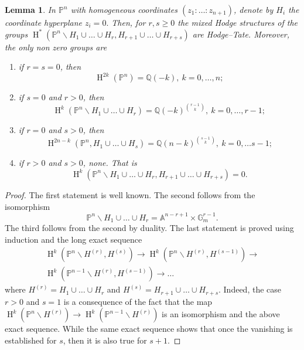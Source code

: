 \documentclass[11pt,a4paper]{amsart}
\newcommand{\A}{\mathds{A}}
\newcommand{\G}{\mathds{G}}
\renewcommand{\P}{\mathds{P}}
\newcommand{\Q}{\mathds{Q}}
\DeclareMathOperator{\rH}{H}
\numberwithin{equation}{section}
\theoremstyle{plain}
\newtheorem{lem}[prop]{Lemma}
\theoremstyle{definition}
\begin{document}
\begin{lem}\label{lemm:4} In $\P^{n}$ with homogeneous coordinates $(z_{1}\colon
  \dots\colon z_{n+1})$, denote by $H_{i}$ the coordinate hyperplane
  $z_{i}=0.$ Then, for $r,s \ge 0$ the mixed Hodge structures of the
  groups $\rH^{\ast}(\P^{n}\smallsetminus H_{1}\cup\dots \cup
  H_{r}, H_{r+1}\cup \dots \cup H_{r+s})$ are Hodge--Tate. Moreover, the
  only non zero groups are 
  \begin{enumerate}
  \item if $r=s=0$, then
    \begin{displaymath}
      \rH^{2k}(\P^{n})= \Q(-k),\ k=0,\dots,n;  
    \end{displaymath}
  \item if $s=0$ and $r>0$, then
    \begin{displaymath}
      \rH^{k}(\P^{n}\smallsetminus H_{1}\cup\dots\cup H_{r})=
      \Q(-k)^{\binom{r-1}{k}},\ k=0,\dots,r-1;
    \end{displaymath}
  \item if $r=0$ and $s>0$, then
    \begin{displaymath}
      \rH^{2n-k}(\P^{n},H_{1}\cup\dots\cup H_{s})=
      \Q(n-k)^{\binom{s-1}{k}},\ k=0,\dots s-1; 
    \end{displaymath}
  \item if $r>0$ and $s>0$, none. That is
    \begin{displaymath}
      \rH^{k}(\P^{n}\smallsetminus H_{1}\cup\dots \cup
  H_{r},H_{r+1}\cup \dots \cup H_{r+s})=0.
    \end{displaymath}
  \end{enumerate}
\end{lem}
\begin{proof}
  The first statement is well known. The second follows from the
  isomorphism
  \begin{displaymath}
    \P^{n}\smallsetminus H_{1}\cup\dots\cup H_{r}=\A^{n-r+1}\times \G_{m}^{r-1}.
  \end{displaymath}
  The third follows from the second by duality. The last statement is
  proved using induction and the long exact sequence
  \begin{multline*}
    \rH^{k}(\P^{n}\smallsetminus H^{(r)},H^{(s)}) \longrightarrow
        \rH^{k}(\P^{n}\smallsetminus H^{(r)},H^{(s-1)})
        \longrightarrow\\
            \rH^{k}(\P^{n-1}\smallsetminus H^{(r)},H^{(s-1)})
            \longrightarrow
            \dots
          \end{multline*}
          where $H^{(r)}=H_{1}\cup \dots \cup H_{r}$ and
          $H^{(s)}=H_{r+1}\cup\dots \cup H_{r+s}$. Indeed, the case
          $r>0$ and $s=1$ is a consequence of the fact that the map
          $\rH^{k}(\P^{n}\smallsetminus H^{(r)})\to
          \rH^{k}(\P^{n-1}\smallsetminus H^{(r)}) $ is an isomorphism and
          the above exact sequence. While the same exact sequence
          shows that once the vanishing is established for $s$, then it
          is also true for $s+1$. 
\end{proof}
\end{document}
